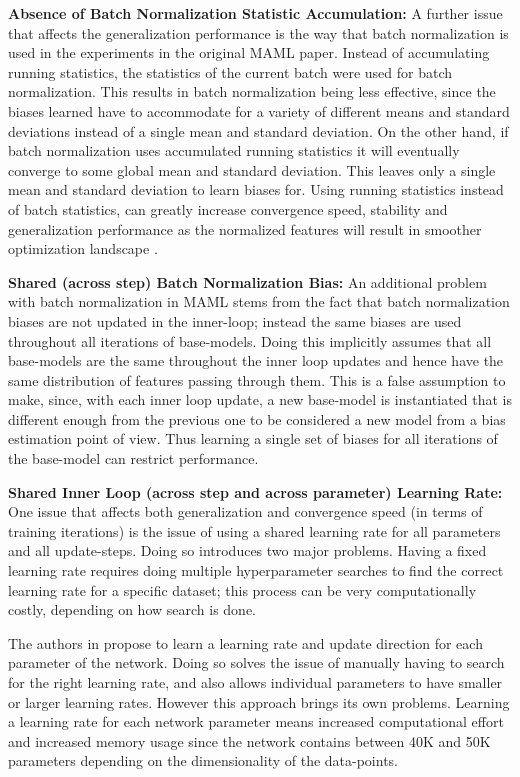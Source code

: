 \documentclass{article} \usepackage[dvipsnames]{xcolor}
\begin{document}
\textbf{Absence of Batch Normalization Statistic Accumulation:} A further issue that affects the generalization performance is the way that batch normalization is used in the experiments in the original MAML paper. Instead of accumulating running statistics, the statistics of the current batch were used for batch normalization. This results in batch normalization being less effective, since the biases learned have to accommodate for a variety of different means and standard deviations instead of a single mean and standard deviation. On the other hand, if batch normalization uses accumulated running statistics it will eventually converge to some global mean and standard deviation. This leaves only a single mean and standard deviation to learn biases for. Using running statistics instead of batch statistics, can greatly increase convergence speed, stability and generalization performance as the normalized features will result in smoother optimization landscape \citep{santurkar2018does}. 





\textbf{Shared (across step) Batch Normalization Bias:} An additional problem with batch normalization in MAML stems from the fact that batch normalization biases are not updated in the inner-loop; instead the same biases are used throughout all iterations of base-models. Doing this implicitly assumes that all base-models are the same throughout the inner loop updates and hence have the same distribution of features passing through them. This is a false assumption to make, since, with each inner loop update, a new base-model is instantiated that is different enough from the previous one to be considered a new model from a bias estimation point of view. Thus learning a single set of biases for all iterations of the base-model can restrict performance.

\textbf{Shared Inner Loop (across step and across parameter) Learning Rate:} One issue that affects both generalization and convergence speed (in terms of training iterations) is the issue of using a shared learning rate for all parameters and all update-steps. Doing so introduces two major problems. Having a fixed learning rate requires doing multiple hyperparameter searches to find the correct learning rate for a specific dataset; this process can be very computationally costly, depending on how search is done. 



The authors in \citep{li2017meta} propose to learn a learning rate and update direction for each parameter of the network. Doing so solves the issue of manually having to search for the right learning rate, and also allows individual parameters to have smaller or larger learning rates. However this approach brings its own problems. Learning a learning rate for each network parameter means increased computational effort and increased memory usage since the network contains between 40K and 50K parameters depending on the dimensionality of the data-points. 
\end{document}
